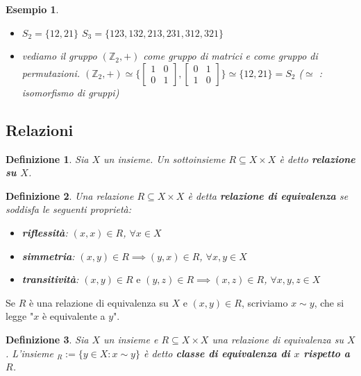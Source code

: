 \documentclass[a4paper,12pt]{article}
\theoremstyle{def}
\newtheorem*{definition}{Definizione}
\theoremstyle{prop}
\theoremstyle{esempio}
\newtheorem*{example}{Esempio}
\theoremstyle{dimostrazione}
\theoremstyle{teo}
\theoremstyle{osservazione}
\begin{document}
\begin{example}
	\
	\begin{itemize}
		\item \(S_2 = \{12,21\}\)\newline
		      \(S_3 = \{123,132,213,231,312,321\}\)\newline
		      
		\item vediamo il gruppo \((\mathbb{Z}_2,+)\) come gruppo di matrici e come gruppo di permutazioni. \((\mathbb{Z}_2, +) \simeq \{\begin{bmatrix}
			      1 & 0  \\
			      0 & 1
		      \end{bmatrix}, \begin{bmatrix}
			      0 & 1  \\
			      1 & 0
		      \end{bmatrix}\} \simeq \{12,21\} = S_2\) (\(\simeq\) : isomorfismo di gruppi)
	\end{itemize}
\end{example}

\subsection{Relazioni}

\begin{definition}
	Sia \(X\) un insieme. Un sottoinsieme \(R \subseteq X \times X\) è detto \textbf{relazione su \(X\)}.
\end{definition}

\begin{definition}
	Una relazione \(R \subseteq X \times X\) è detta \textbf{relazione di equivalenza} se soddisfa le seguenti proprietà: \
	\begin{itemize}
		\item \textbf{riflessità}: \((x,x) \in R\), \(\forall x \in X\)
		\item \textbf{simmetria}: \((x,y) \in R \implies (y,x) \in R\), \(\forall x,y \in X\)
		\item \textbf{transitività}: \((x,y) \in R \text{ e } (y,z) \in R \implies (x,z) \in R\), \(\forall x,y,z \in X\)
	\end{itemize}
\end{definition}

Se \(R\) è una relazione di equivalenza su \(X\) e \((x,y) \in R\), scriviamo \(x \sim y\),
che si legge "\(x\) è equivalente a \(y\)".

\begin{definition}
	Sia \(X\) un insieme e \(R \subseteq X \times X\) una relazione di equivalenza su \(X\). L'insieme
	\begin{math}
		[x]_R := \{y \in X : x \sim y\}
	\end{math} è detto \textbf{classe di equivalenza di \(x\) rispetto a \(R\)}.
\end{definition}
\end{document}
